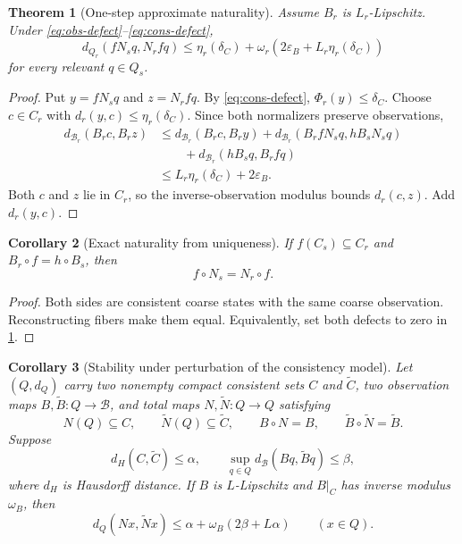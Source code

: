 \documentclass[11pt]{article}
\newtheorem{theorem}{Theorem}[section]
\newtheorem{corollary}[theorem]{Corollary}
\theoremstyle{definition}
\theoremstyle{remark}
\numberwithin{equation}{section}
\newcommand{\cB}{\mathcal B}
\newcommand{\eps}{\varepsilon}
\begin{document}
\begin{theorem}[One-step approximate naturality]\label{thm:one-step-naturality}
Assume $B_r$ is $L_r$-Lipschitz.  Under \eqref{eq:obs-defect}--\eqref{eq:cons-defect},
\begin{equation}\label{eq:one-step-naturality}
 d_{Q_r}(fN_s q,N_rfq)
 \le
 \eta_r(\delta_C)+
 \omega_r\!\left(2\eps_B+L_r\eta_r(\delta_C)\right)
\end{equation}
for every relevant $q\in Q_s$.
\end{theorem}

\begin{proof}
Put $y=fN_s q$ and $z=N_rfq$.  By \eqref{eq:cons-defect}, $\Phi_r(y)\le\delta_C$.  Choose $c\in C_r$ with $d_r(y,c)\le\eta_r(\delta_C)$.  Since both normalizers preserve observations,
\begin{align*}
 d_{\cB_r}(B_rc,B_rz)
 &\le d_{\cB_r}(B_rc,B_ry)
      +d_{\cB_r}(B_rfN_sq,hB_sN_sq)\\
 &\qquad+d_{\cB_r}(hB_sq,B_rfq)\\
 &\le L_r\eta_r(\delta_C)+2\eps_B.
\end{align*}
Both $c$ and $z$ lie in $C_r$, so the inverse-observation modulus bounds $d_r(c,z)$.  Add $d_r(y,c)$.
\end{proof}

\begin{corollary}[Exact naturality from uniqueness]\label{cor:exact-naturality}
If $f(C_s)\subseteq C_r$ and $B_r\circ f=h\circ B_s$, then
\[
 f\circ N_s=N_r\circ f.
\]
\end{corollary}

\begin{proof}
Both sides are consistent coarse states with the same coarse observation.  Reconstructing fibers make them equal.  Equivalently, set both defects to zero in \cref{thm:one-step-naturality}.
\end{proof}

\begin{corollary}[Stability under perturbation of the consistency model]\label{cor:model-perturbation}
Let $(Q,d_Q)$ carry two nonempty compact consistent sets $C$ and $\widetilde C$, two observation maps $B,\widetilde B:Q\to\cB$, and total maps $N,\widetilde N:Q\to Q$ satisfying
\[
 N(Q)\subseteq C,
 \qquad
 \widetilde N(Q)\subseteq\widetilde C,
 \qquad
 B\circ N=B,
 \qquad
 \widetilde B\circ\widetilde N=\widetilde B.
\]
Suppose
\[
 d_H(C,\widetilde C)\le\alpha,
 \qquad
 \sup_{q\in Q}d_{\cB}(Bq,\widetilde Bq)\le\beta,
\]
where $d_H$ is Hausdorff distance.  If $B$ is $L$-Lipschitz and $B|_C$ has inverse modulus $\omega_B$, then
\[
 d_Q(Nx,\widetilde Nx)
 \le
 \alpha+\omega_B(2\beta+L\alpha)
 \qquad(x\in Q).
\]
\end{corollary}
\end{document}
